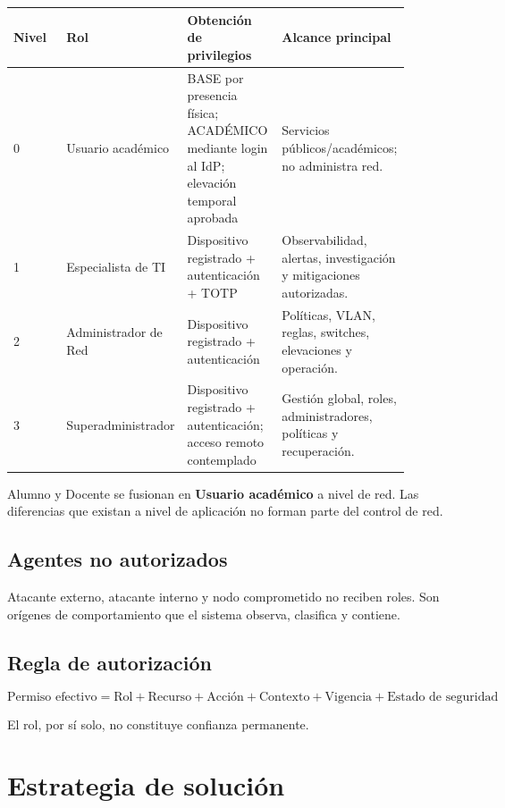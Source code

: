 \documentclass[11pt,a4paper]{article}
\begin{document}
\begin{longtable}{p{0.14\linewidth}p{0.18\linewidth}p{0.24\linewidth}p{0.32\linewidth}}
\toprule
Nivel & Rol & Obtención de privilegios & Alcance principal\\
\midrule
0 & Usuario académico & BASE por presencia física; ACADÉMICO mediante login al IdP; elevación temporal aprobada & Servicios públicos/académicos; no administra red.\\
1 & Especialista de TI & Dispositivo registrado + autenticación + TOTP & Observabilidad, alertas, investigación y mitigaciones autorizadas.\\
2 & Administrador de Red & Dispositivo registrado + autenticación & Políticas, VLAN, reglas, switches, elevaciones y operación.\\
3 & Superadministrador & Dispositivo registrado + autenticación; acceso remoto contemplado & Gestión global, roles, administradores, políticas y recuperación.\\
\bottomrule
\end{longtable}

Alumno y Docente se fusionan en \textbf{Usuario académico} a nivel de red. Las diferencias que existan a nivel de aplicación no forman parte del control de red.

\subsection{Agentes no autorizados}

Atacante externo, atacante interno y nodo comprometido no reciben roles. Son orígenes de comportamiento que el sistema observa, clasifica y contiene.

\subsection{Regla de autorización}

\begin{equation}
\boxed{\text{Permiso efectivo} = \text{Rol} + \text{Recurso} + \text{Acción} + \text{Contexto} + \text{Vigencia} + \text{Estado de seguridad}}
\end{equation}

El rol, por sí solo, no constituye confianza permanente.

\section{Estrategia de solución}
\end{document}
